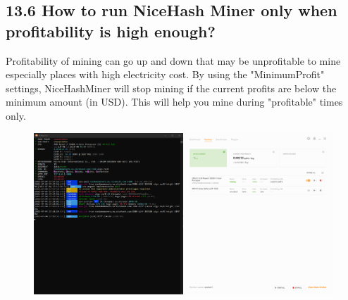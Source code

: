 \subsection*{13.6 How to run NiceHash Miner only when profitability is high enough?}
Profitability of mining can go up and down that may be unprofitable to mine especially places with high electricity cost. By using the "MinimumProfit" settings, NiceHashMiner will stop mining if the current profits are below the minimum amount (in USD). This will help you mine during "profitable" times only.
\begin{figure}[h]
	\centering
	\includegraphics[width=1\linewidth]{"images/Screenshot (14)"}
	\captionsetup{labelformat=empty}\caption{}
\end{figure}



